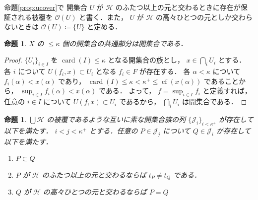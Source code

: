 \documentclass[leqno, 12pt]{ltjsarticle}
\newtheorem{prop}[thm]{命題}
\newcommand{\basicopen}[2]{U(#1,#2)}
\newcommand{\kappasucc}{\kappa^{+}}
\DeclareMathOperator{\card}{card}
\DeclareMathOperator{\cf}{cf}
\begin{document}
命題\ref{prop:ucover}で
開集合
$U$
が
$\mathcal{H}$
のふたつ以上の元と交わるときに存在が保証される被覆を
$\mathcal{O}(U)$
と書く．また，
$U$
が
$\mathcal{H}$
の高々ひとつの元としか交わらないときは
$\mathcal{O}(U)\coloneqq\{U\}$
と定める．


\begin{prop}
$X$
の
$\le\kappa$
個の開集合の共通部分は開集合である．
\end{prop}
\begin{proof}
$\{U_{i}\}_{i\in I}$
を
$\card(I)\le\kappa$
となる開集合の族とし，
$x\in \bigcap_{i} U_{i}$
とする．
各
$i$
について
$\basicopen{f_{i}}{x}\subset U_{i}$
となる
$f_{i}\in F$
が存在する．
各
$\alpha<\kappa$
について
$f_{i}(\alpha)<x(\alpha)$
であり，
$\card(I)\le\kappa<\kappasucc\le\cf(x(\alpha))$
であることから，
$\sup_{i\in I}f_{i}(\alpha)<x(\alpha)$
である．
よって，
$f=\sup_{i\in I}f_{i}$
と定義すれば，任意の
$i\in I$
について
$\basicopen{f}{x}\subset U_{i}$
であるから，
$\bigcap_{i}U_{i}$
は開集合である．
\end{proof}



\begin{prop}
$\bigcup\mathcal{H}$
の被覆であるような互いに素な開集合族の列
$\{\mathcal{J}_{i}\}_{i<\kappasucc}$
が存在して以下を満たす．
$i<j<\kappasucc$
とする．任意の
$P\in \mathcal{J}_{j}$
について
$Q\in \mathcal{J}_{i}$
が存在して以下を満たす．
\begin{enumerate}[label=\textup{(\arabic*)}]
\item
$P\subset Q$
\item
$P$
が
$\mathcal{H}$
のふたつ以上の元と交わるならば
$t_{P}\neq t_{Q}$
である．
\item
$Q$
が
$\mathcal{H}$
の高々ひとつの元と交わるならば
$P=Q$
\end{enumerate}

\end{prop}
\end{document}
